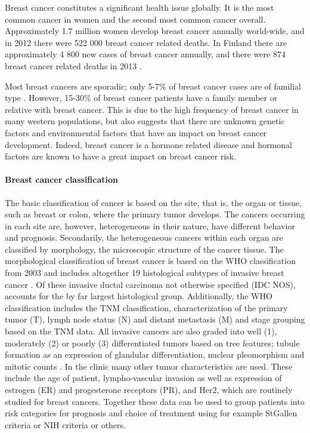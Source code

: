 Breast cancer constitutes a significant health issue globally. It is the most
common cancer in women and the second most common cancer overall.
Approximately 1.7 million women develop breast cancer annually world-wide, and
in 2012 there were 522 000 breast cancer related deaths.
\citep{Ferlay2015} In Finland there are approximately 4 800 new cases of
breast cancer annually, and there were 874 breast cancer related deaths in
2013 \citep{Syoparekisteri}.

Most breast cancers are sporadic; only 5-7\% of breast cancer cases are of
familial type \citep{Melchor2013}. However, 15-30\% of breast cancer patients
have a family member or relative with breast cancer. This is due to the high
frequency of breast cancer in many western populations, but also suggests that
there are unknown genetic factors and environmental factors that have an
impact on breast cancer development.  Indeed, breast cancer is a hormone
related disease and hormonal factors are known to have a great impact on
breast cancer risk.


\paragraph{Breast cancer classification}\label{breast-cancer-classification}

The basic classification of cancer is based on the site, that is, the organ or
tissue, such as breast or colon, where the primary tumor develops. The cancers
occurring in each site are, however, heterogeneous in their nature, have
different behavior and prognosis. Secondarily, the heterogeneous cancers
within each organ are classified by morphology, the microscopic structure of
the cancer tissue.  The morphological classification of breast cancer is based
on the WHO classification from 2003 and includes altogether 19 histological
subtypes of invasive breast cancer \citep{T8,T9}. Of these invasive ductal carcinoma
not otherwise specified (IDC NOS), accounts for the by far largest
histological group.  Additionally, the WHO classification includes the TNM
classification, characterization of the primary tumor (T), lymph node status
(N) and distant metastasis (M) and stage grouping based on the TNM data. All
invasive cancers are also graded into well (1), moderately (2) or poorly (3)
differentiated tumors based on  tree features; tubule formation as an
expression of glandular differentiation, nuclear pleomorphism and mitotic
counts \citep{T8}.  In the clinic many other tumor characteristics are used.  These
include the age of patient, lympho-vascular invasion as well as expression of
estrogen (ER) and progesterone receptors (PR), and Her2, which are routinely
studied for breast cancers. Together these data can be used to group patients
into risk categories for prognosis and choice of treatment using for example
StGallen criteria \citep{T11} or NIH criteria \citep{T12} or others.

